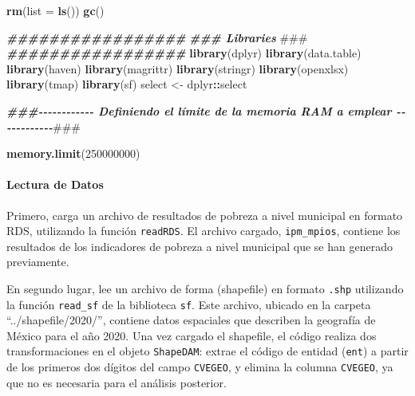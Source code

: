 \documentclass[
  12pt,
]{book}
\newenvironment{Shaded}{\begin{snugshade}}{\end{snugshade}}
\newcommand{\AlertTok}[1]{\textcolor[rgb]{0.94,0.16,0.16}{#1}}
\newcommand{\AttributeTok}[1]{\textcolor[rgb]{0.13,0.29,0.53}{#1}}
\newcommand{\DecValTok}[1]{\textcolor[rgb]{0.00,0.00,0.81}{#1}}
\newcommand{\DocumentationTok}[1]{\textcolor[rgb]{0.56,0.35,0.01}{\textbf{\textit{#1}}}}
\newcommand{\FunctionTok}[1]{\textcolor[rgb]{0.13,0.29,0.53}{\textbf{#1}}}
\newcommand{\NormalTok}[1]{#1}
\newcommand{\OtherTok}[1]{\textcolor[rgb]{0.56,0.35,0.01}{#1}}
\newcommand{\SpecialCharTok}[1]{\textcolor[rgb]{0.81,0.36,0.00}{\textbf{#1}}}
\begin{document}
\begin{Shaded}
\begin{Highlighting}[]
\FunctionTok{rm}\NormalTok{(}\AttributeTok{list =} \FunctionTok{ls}\NormalTok{())}
\FunctionTok{gc}\NormalTok{()}

\DocumentationTok{\#\#\#\#\#\#\#\#\#\#\#\#\#\#\#\#\#}
\DocumentationTok{\#\#\# Libraries }\AlertTok{\#\#\#}
\DocumentationTok{\#\#\#\#\#\#\#\#\#\#\#\#\#\#\#\#\#}
\FunctionTok{library}\NormalTok{(dplyr)}
\FunctionTok{library}\NormalTok{(data.table)}
\FunctionTok{library}\NormalTok{(haven)}
\FunctionTok{library}\NormalTok{(magrittr)}
\FunctionTok{library}\NormalTok{(stringr)}
\FunctionTok{library}\NormalTok{(openxlsx)}
\FunctionTok{library}\NormalTok{(tmap)}
\FunctionTok{library}\NormalTok{(sf)}
\NormalTok{select }\OtherTok{\textless{}{-}}\NormalTok{ dplyr}\SpecialCharTok{::}\NormalTok{select}

\DocumentationTok{\#\#\#{-}{-}{-}{-}{-}{-}{-}{-}{-}{-}{-}{-} Definiendo el límite de la memoria RAM a emplear {-}{-}{-}{-}{-}{-}{-}{-}{-}{-}{-}{-}}\AlertTok{\#\#\#}

\FunctionTok{memory.limit}\NormalTok{(}\DecValTok{250000000}\NormalTok{)}
\end{Highlighting}
\end{Shaded}

\hypertarget{lectura-de-datos-6}{%
\paragraph*{Lectura de Datos}\label{lectura-de-datos-6}}

Primero, carga un archivo de resultados de pobreza a nivel municipal en formato RDS, utilizando la función \texttt{readRDS}. El archivo cargado, \texttt{ipm\_mpios}, contiene los resultados de los indicadores de pobreza a nivel municipal que se han generado previamente.

En segundo lugar, lee un archivo de forma (shapefile) en formato \texttt{.shp} utilizando la función \texttt{read\_sf} de la biblioteca \texttt{sf}. Este archivo, ubicado en la carpeta ``../shapefile/2020/'', contiene datos espaciales que describen la geografía de México para el año 2020. Una vez cargado el shapefile, el código realiza dos transformaciones en el objeto \texttt{ShapeDAM}: extrae el código de entidad (\texttt{ent}) a partir de los primeros dos dígitos del campo \texttt{CVEGEO}, y elimina la columna \texttt{CVEGEO}, ya que no es necesaria para el análisis posterior.
\end{document}
